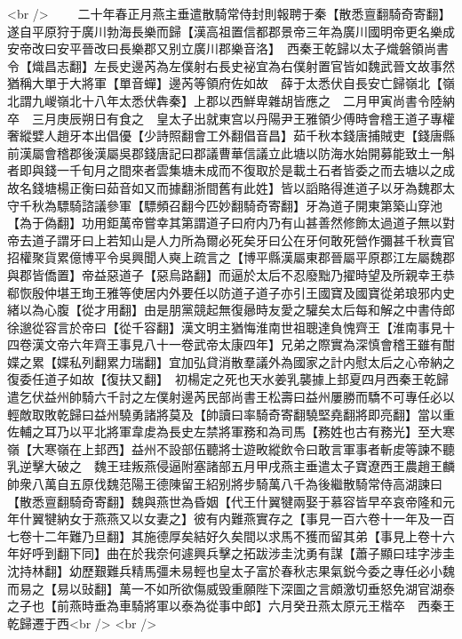 <br />
　　二十年春正月燕主垂遣散騎常侍封則報聘于秦【散悉亶翻騎奇寄翻】遂自平原狩于廣川勃海長樂而歸【漢高祖置信都郡景帝三年為廣川國明帝更名樂成安帝改曰安平晉改曰長樂郡又别立廣川郡樂音洛】　西秦王乾歸以太子熾磐領尚書令【熾昌志翻】左長史邊芮為左僕射右長史袐宜為右僕射置官皆如魏武晉文故事然猶稱大單于大將軍【單音蟬】邊芮等領府佐如故　薛于太悉伏自長安亡歸嶺北【嶺北謂九嵕嶺北十八年太悉伏犇秦】上郡以西鮮卑雜胡皆應之　二月甲寅尚書令陸納卒　三月庚辰朔日有食之　皇太子出就東宫以丹陽尹王雅領少傅時會稽王道子專權奢縱嬖人趙牙本出倡優【少詩照翻會工外翻倡音昌】茹千秋本錢唐捕賊吏【錢唐縣前漢屬會稽郡後漢屬吳郡錢唐記曰郡議曹華信議立此塘以防海水始開募能致土一斛者即與錢一千旬月之間來者雲集塘未成而不復取於是載土石者皆委之而去塘以之成故名錢塘楊正衡曰茹音如又而據翻浙間舊有此姓】皆以謟賂得進道子以牙為魏郡太守千秋為驃騎諮議參軍【驃頻召翻今匹妙翻騎奇寄翻】牙為道子開東第築山穿池【為于偽翻】功用鉅萬帝嘗幸其第謂道子曰府内乃有山甚善然修飾太過道子無以對帝去道子謂牙曰上若知山是人力所為爾必死矣牙曰公在牙何敢死營作彌甚千秋賣官招權聚貨累億博平令吳興聞人奭上疏言之【博平縣漢屬東郡晉屬平原郡江左屬魏郡與郡皆僑置】帝益惡道子【惡烏路翻】而逼於太后不忍廢黜乃擢時望及所親幸王恭郗恢殷仲堪王珣王雅等使居内外要任以防道子道子亦引王國寶及國寶從弟琅邪内史緒以為心腹【從才用翻】由是朋黨競起無復曏時友愛之驩矣太后每和解之中書侍郎徐邈從容言於帝曰【從千容翻】漢文明主猶悔淮南世祖聰達負愧齊王【淮南事見十四卷漢文帝六年齊王事見八十一卷武帝太康四年】兄弟之際實為深慎會稽王雖有酣媟之累【媟私列翻累力瑞翻】宜加弘貸消散羣議外為國家之計内慰太后之心帝納之復委任道子如故【復扶又翻】　初楊定之死也天水姜乳襲據上邽夏四月西秦王乾歸遣乞伏益州帥騎六千討之左僕射邊芮民部尚書王松壽曰益州屢勝而驕不可專任必以輕敵取敗乾歸曰益州驍勇諸將莫及【帥讀曰率騎奇寄翻驍堅堯翻將即亮翻】當以重佐輔之耳乃以平北將軍韋䖍為長史左禁將軍務和為司馬【務姓也古有務光】至大寒嶺【大寒嶺在上邽西】益州不設部伍聽將士遊畋縱飲令曰敢言軍事者斬䖍等諫不聽乳逆擊大破之　魏王珪叛燕侵逼附塞諸部五月甲戌燕主垂遣太子寶遼西王農趙王麟帥衆八萬自五原伐魏范陽王德陳留王紹别將步騎萬八千為後繼散騎常侍高湖諫曰【散悉亶翻騎奇寄翻】魏與燕世為昏姻【代王什翼犍兩娶于慕容皆早卒哀帝隆和元年什翼犍納女于燕燕又以女妻之】彼有内難燕實存之【事見一百六卷十一年及一百七卷十二年難乃旦翻】其施德厚矣結好久矣間以求馬不獲而留其弟【事見上卷十六年好呼到翻下同】曲在於我奈何遽興兵擊之拓跋涉圭沈勇有謀【蕭子顯曰珪字涉圭沈持林翻】幼歷艱難兵精馬彊未易輕也皇太子富於春秋志果氣鋭今委之專任必小魏而易之【易以䜴翻】萬一不如所欲傷威毁重願陛下深圖之言頗激切垂怒免湖官湖泰之子也【前燕時垂為車騎將軍以泰為從事中郎】六月癸丑燕太原元王楷卒　西秦王乾歸遷于西<br />
<br />
